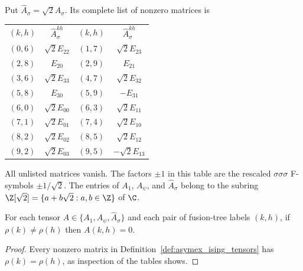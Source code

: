 \begin{definition}
    Put $\widehat A_\sigma=\sqrt2A_\sigma$. Its complete list of
    nonzero matrices is
    \begin{center}
        \begin{tabular}{c@{\quad}c@{\qquad}c@{\quad}c}
            $(k,h)$ & $\widehat A_\sigma^{kh}$ &
            $(k,h)$ & $\widehat A_\sigma^{kh}$                             \\[2pt]
            $(0,6)$ & $\sqrt2E_{22}$           & $(1,7)$ & $\sqrt2E_{23}$  \\
            $(2,8)$ & $E_{20}$                 & $(2,9)$ & $E_{21}$        \\
            $(3,6)$ & $\sqrt2E_{33}$           & $(4,7)$ & $\sqrt2E_{32}$  \\
            $(5,8)$ & $E_{30}$                 & $(5,9)$ & $-E_{31}$       \\
            $(6,0)$ & $\sqrt2E_{00}$           & $(6,3)$ & $\sqrt2E_{11}$  \\
            $(7,1)$ & $\sqrt2E_{01}$           & $(7,4)$ & $\sqrt2E_{10}$  \\
            $(8,2)$ & $\sqrt2E_{02}$           & $(8,5)$ & $\sqrt2E_{12}$  \\
            $(9,2)$ & $\sqrt2E_{03}$           & $(9,5)$ & $-\sqrt2E_{13}$
        \end{tabular}
    \end{center}
    All unlisted matrices vanish. The factors $\pm1$ in this table
    are the rescaled $\sigma\sigma\sigma$ F-symbols $\pm1/\sqrt2$.
    The entries of $A_1$, $A_\psi$, and $\widehat A_\sigma$ belong
    to the subring $\Z[\sqrt2]=\{a+b\sqrt2:a,b\in\Z\}$ of $\C$.
\end{definition}

\begin{lemma}%
    \label{thm:asymex_ising_sector_vanishing}
    \leanok
    For each tensor $A \in \{A_1, A_\psi, \widehat A_\sigma\}$ and each pair
    of fusion-tree labels $(k,h)$, if $\rho(k) \ne \rho(h)$ then
    $A(k,h) = 0$.
\end{lemma}

\begin{proof}
    \leanok
    Every nonzero matrix in Definition~\ref{def:asymex_ising_tensors}
    has $\rho(k)=\rho(h)$, as inspection of the tables shows.
\end{proof}

